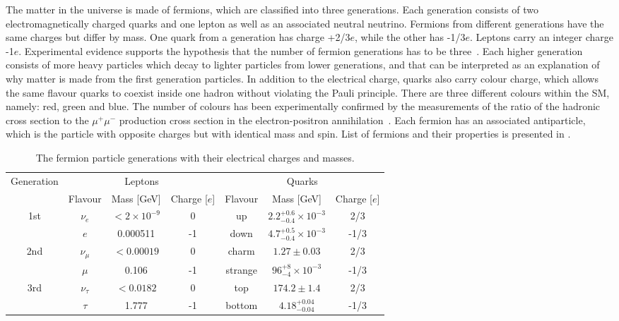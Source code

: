 The matter in the universe is made of fermions, which are classified into three generations.
Each generation consists of two electromagnetically charged quarks and one lepton as well as an associated neutral neutrino.
Fermions from different generations have the same charges but differ by mass.
One quark from a generation has charge +2/3$e$, while the other has -1/3$e$. Leptons carry an integer charge -1$e$.
Experimental evidence supports the hypothesis that the number of fermion generations has to be three~\cite{three_lepton_generations}.
Each higher generation consists of more heavy particles which decay to lighter particles from lower generations, and that can be
interpreted as an explanation of why matter is made from the first generation particles.
In addition to the electrical charge, quarks also carry colour charge, which allows the same flavour quarks to coexist inside one hadron without violating the Pauli principle.
There are three different colours within the SM, namely: red, green and blue.
The number of colours has been experimentally confirmed by the measurements of the ratio of the hadronic cross section 
to the $\mu^+\mu^-$ production cross section in the electron-positron annihilation~\cite{pdg_2014}. 
Each fermion has an associated antiparticle, which is the particle with opposite charges but with identical mass and spin.
List of fermions and their properties is presented in .

\begin{table*}[!ht]
\begin{center}
\begin{tabular}{c||c|c|c||c|c|c}
\multirow{2}{*}{Generation} & \multicolumn{3}{c||}{Leptons} & \multicolumn{3}{c}{Quarks} \\
\cline{2-7}
 & Flavour & Mass [GeV] & Charge [$e$] &  Flavour & Mass [GeV] & Charge [$e$] \\
\hline
\multirow{2}{*}{1st} & $\nu_e$ & $<2\times10^{-9}$ & 0 & up & $2.2^{+0.6}_{-0.4}\times10^{-3}$ & 2/3 \\
 & $e$ & 0.000511 & -1 & down & $4.7^{+0.5}_{-0.4}\times10^{-3}$ & -1/3 \\
\cline{1-7} 
\multirow{2}{*}{2nd} & $\nu_{\mu}$ & $<0.00019$ & 0 & charm & $1.27\pm0.03$ & 2/3 \\
 & $\mu$ & 0.106 & -1 & strange & $96^{+8}_{-4}\times10^{-3}$ & -1/3 \\
\cline{1-7}
\multirow{2}{*}{3rd} & $\nu_{\tau}$ & $<0.0182$ & 0 & top & $174.2\pm1.4$ & 2/3 \\
 & $\tau$ & 1.777 & -1 & bottom & $4.18^{+0.04}_{-0.04}$ & -1/3 \\
\end{tabular}
\end{center}
 \caption{The fermion particle generations with their electrical charges and masses.}
\label{tab:fermions}
\end{table*}

